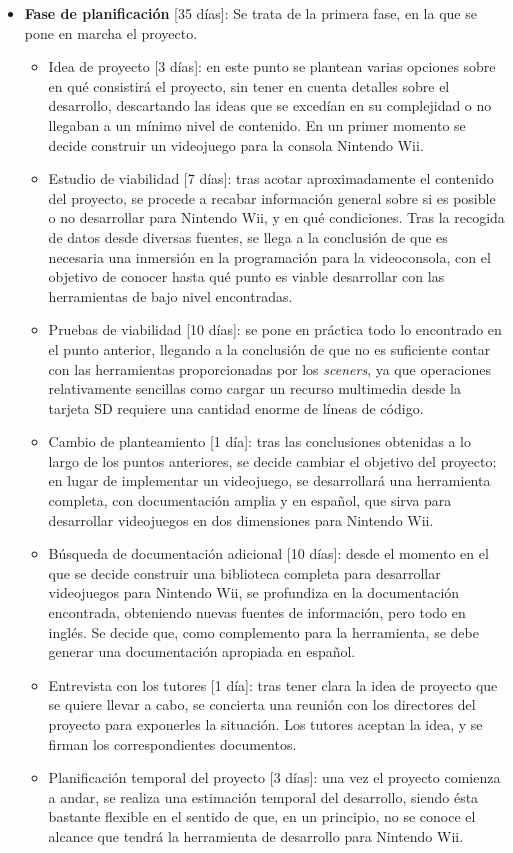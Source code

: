 \begin{itemize}
\item \textbf{Fase de planificación} [35 días]: Se trata de la primera fase, en la que se pone en marcha el proyecto.
	\begin{itemize}
	\item Idea de proyecto [3 días]: en este punto se plantean varias opciones sobre en qué consistirá el proyecto, sin tener en cuenta detalles sobre el desarrollo, descartando las ideas que se excedían en su complejidad o no llegaban a un mínimo nivel de contenido. En un primer momento se decide construir un videojuego para la consola Nintendo Wii.
	\item Estudio de viabilidad [7 días]: tras acotar aproximadamente el contenido del proyecto, se procede a recabar información general sobre si es posible o no desarrollar para Nintendo Wii, y en qué condiciones. Tras la recogida de datos desde diversas fuentes, se llega a la conclusión de que es necesaria una inmersión en la programación para la videoconsola, con el objetivo de conocer hasta qué punto es viable desarrollar con las herramientas de bajo nivel encontradas.
	\item Pruebas de viabilidad [10 días]: se pone en práctica todo lo encontrado en el punto anterior, llegando a la conclusión de que no es suficiente contar con las herramientas proporcionadas por los \emph{sceners}, ya que operaciones relativamente sencillas como cargar un recurso multimedia desde la tarjeta SD requiere una cantidad enorme de líneas de código.
	\item Cambio de planteamiento [1 día]: tras las conclusiones obtenidas a lo largo de los puntos anteriores, se decide cambiar el objetivo del proyecto; en lugar de implementar un videojuego, se desarrollará una herramienta completa, con documentación amplia y en español, que sirva para desarrollar videojuegos en dos dimensiones para Nintendo Wii.
	\item Búsqueda de documentación adicional [10 días]: desde el momento en el que se decide construir una biblioteca completa para desarrollar videojuegos para Nintendo Wii, se profundiza en la documentación encontrada, obteniendo nuevas fuentes de información, pero todo en inglés. Se decide que, como complemento para la herramienta, se debe generar una documentación apropiada en español.
	\item Entrevista con los tutores [1 día]: tras tener clara la idea de proyecto que se quiere llevar a cabo, se concierta una reunión con los directores del proyecto para exponerles la situación. Los tutores aceptan la idea, y se firman los correspondientes documentos.
	\item Planificación temporal del proyecto [3 días]: una vez el proyecto comienza a andar, se realiza una estimación temporal del desarrollo, siendo ésta bastante flexible en el sentido de que, en un principio, no se conoce el alcance que tendrá la herramienta de desarrollo para Nintendo Wii.
	\end{itemize}


\end{itemize}
